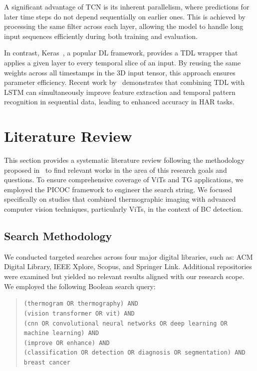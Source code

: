 \documentclass[runningheads]{llncs}
\begin{document}
A significant advantage of \ac{TCN} is its inherent parallelism, where
predictions for later time steps do not depend sequentially on earlier
ones. This is achieved by processing the same filter across each
layer, allowing the model to handle long input sequences efficiently
during both training and evaluation.

In contrast, Keras~\cite{chollet2015keras}, a popular \ac{DL}
framework, provides a \ac{TDL} wrapper that applies a given layer to
every temporal slice of an input. By reusing the same weights across
all timestamps in the 3D input tensor, this approach ensures parameter
efficiency. Recent work by~\cite{Dhage2025} demonstrates that
combining \ac{TDL} with LSTM can simultaneously improve feature
extraction and temporal pattern recognition in sequential data,
leading to enhanced accuracy in \ac{HAR} tasks.


\section{Literature Review}
\label{sec:literature-review}

This section provides a systematic literature review following the
methodology proposed in~\cite{kitchenham2009systematic} to find
relevant works in the area of this research goals and questions.
To ensure comprehensive coverage of \ac{ViTs} and \ac{TG} applications, we
employed the \ac{PICOC} framework to engineer the search string. We focused
specifically on studies that combined thermographic imaging with
advanced computer vision techniques, particularly \ac{ViTs}, in the context of \ac{BC} detection.

\subsection{Search Methodology}
\label{sec:search-methodology}

We conducted targeted searches across four major digital libraries,
such as: ACM Digital Library, IEEE Xplore, Scopus, and Springer
Link. Additional repositories were examined but yielded no relevant
results aligned with our research scope. We employed the following
Boolean search query:

\begin{quote}
  \scriptsize
\texttt{(thermogram OR thermography) AND} \\
\texttt{(vision transformer OR vit) AND} \\
\texttt{(cnn OR convolutional neural networks OR deep learning OR machine learning) AND} \\
\texttt{(improve OR enhance) AND} \\
\texttt{(classification OR detection OR diagnosis OR segmentation) AND} \\
\texttt{breast cancer}
\end{quote} 
\end{document}
